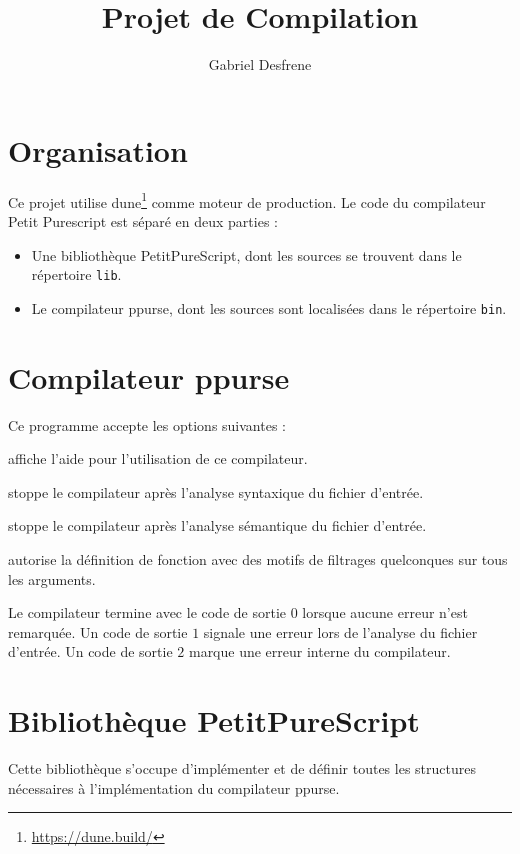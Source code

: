 \documentclass[french, 12pt]{article}
\title{{\large Projet de Compilation}\\\pps}
\author{Gabriel Desfrene}
\newcommand{\pps}{\textsf{Petit Purescript}}
\begin{document}
\maketitle

\section*{Organisation}
Ce projet utilise \textsf{dune}\footnote{\url{https://dune.build/}} comme moteur
de production.
Le code du compilateur \pps{} est séparé en deux parties :
\begin{itemize}
    \item Une bibliothèque \textsf{PetitPureScript}, dont les sources se trouvent
          dans le répertoire \texttt{lib}.
    \item Le compilateur \textsf{ppurse}, dont les sources sont localisées dans
          le répertoire \texttt{bin}.
\end{itemize}

\section*{Compilateur \textsf{ppurse}}
Ce programme accepte les options suivantes :
\begin{description}[font=\normalfont, leftmargin=!, labelwidth=\widthof{\texttt{----permissive}}]
    \item[\texttt{----help}] affiche l'aide pour l'utilisation de ce compilateur.
    \item[\texttt{----parse-only}] stoppe le compilateur après l'analyse
        syntaxique du fichier d'entrée.
    \item[\texttt{----type-only}] stoppe le compilateur après l'analyse
        sémantique du fichier d'entrée.
    \item[\texttt{----permissive}] autorise la définition de fonction avec des
        motifs de filtrages quelconques sur tous les arguments.
\end{description}

Le compilateur termine avec le code de sortie $0$ lorsque aucune erreur n'est
remarquée. Un code de sortie $1$ signale une erreur lors de l'analyse du fichier
d'entrée. Un code de sortie $2$ marque une erreur interne du compilateur.

\section*{Bibliothèque \textsf{PetitPureScript}}
Cette bibliothèque s'occupe d'implémenter et de définir toutes les structures
nécessaires à l'implémentation du compilateur \textsf{ppurse}.
\end{document}

